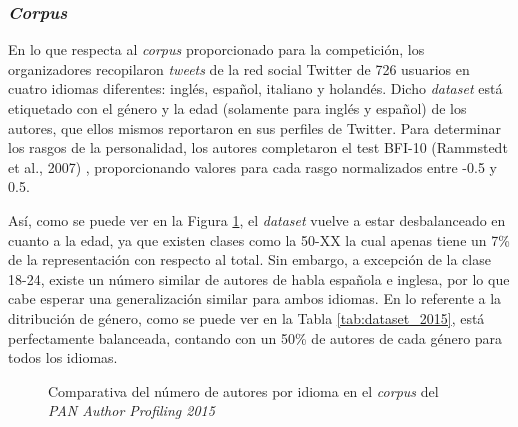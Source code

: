 \subsubsection{\textit{Corpus}}

\bigskip
En lo que respecta al \textit{corpus} proporcionado para la competición, los organizadores recopilaron \textit{tweets} de la red social Twitter
de 726 usuarios en cuatro idiomas diferentes: inglés, español, italiano y holandés. Dicho \textit{dataset} está etiquetado con el género y la edad
(solamente para inglés y español) de los autores, que ellos mismos reportaron en sus perfiles de Twitter. Para determinar los rasgos de la personalidad,
los autores completaron el test BFI-10 (Rammstedt et al., 2007) \cite{rammstedt2007measuring}, proporcionando valores para cada rasgo normalizados entre -0.5 y 0.5.

\bigskip
Así, como se puede ver en la Figura \ref{fig:dataset_2015}, el \textit{dataset} vuelve a estar desbalanceado en cuanto a la edad, ya que existen
clases como la 50-XX la cual apenas tiene un 7\% de la representación con respecto al total. Sin embargo,
a excepción de la clase 18-24, existe un número similar de autores de habla española e inglesa, por lo que cabe esperar una generalización
similar para ambos idiomas. En lo referente a la ditribución de género, como se puede ver en la Tabla \ref{tab:dataset_2015}, está perfectamente balanceada,
contando con un 50\% de autores de cada género para todos los idiomas.

\bigskip
\begin{figure}[H]
	\centering
	\caption{Comparativa del número de autores por idioma en el \textit{corpus} del \textit{PAN Author Profiling 2015}}
	\label{fig:dataset_2015}
\end{figure}

